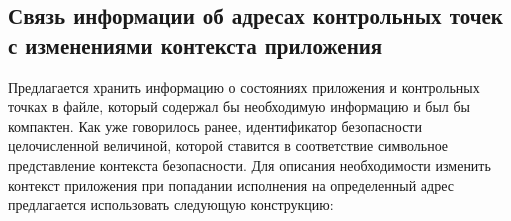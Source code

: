 \bigskip 
\subsection{Связь информации об адресах контрольных точек с изменениями
	контекста приложения} 

\begin{comment}
Для наблюдения за состояниями приложения и переключения 
контекстов во время исполнения необходимо некоторым образом связять 
информацию об адресах контрольных точек с информацией об
изменениях контекста безопасности приложения, соответствующих
данным контрольным точкам. 

\bigskip
{\bfseries Недостатки данного подхода.} 

Основным недостатком данного подхода является необходимость
внедрять вызовы интерфейсов динамического изменения контекста
непосредственно в приложение. Предлагаемый же подход
предполагает использование немодифицированных приложений.

Это влечет за собой сразу 
несколько серьезных проблем. Во-первых, маловероятно, что 
разработчики будут делать это самостоятельно, тем более, 
что у них получится корректно выделить те участки кода, 
на которых приложению нужны различные привилегии, и 
корректно определить необходимые контексты. В таком случае, 
для обеспечения возможности использования этого метода, 
приложение должны изменять третьи разработчики, следовательно, 
такие приложения будут отличны от основной ветки и патчи 
вместе с пересборкой придется осуществлять при выходе 
каждого очередного релиза приложения. Но более 
серьезной проблемой является то, что информация передается 
непосредственно из пользовательского пространства в ядро. 
В данном случае на стороне ядра невозможно определить, 
был ли сделан данный вызов в ходе нормального хода 
выполнения приложения, либо злоумышленник изменил нормальный
ход выполнения и выполнил данный вызов с целью повышения 
прав.
\end{comment} 

\bigskip
Предлагается хранить информацию о состояниях 
приложения и контрольных точках в файле, который 
содержал бы необходимую информацию и был бы компактен.
Как уже говорилось ранее, идентификатор безопасности 
целочисленной величиной, которой ставится в соответствие 
символьное представление контекста безопасности. Для 
описания необходимости изменить контекст приложения 
при попадании исполнения на определенный адрес предлагается 
использовать следующую конструкцию: 

